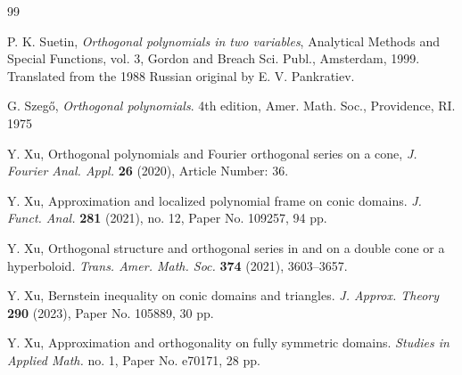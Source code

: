 \documentclass{amsart}
\theoremstyle{remark}
\def\RR{{\mathbb R}}
\begin{document}
\begin{thebibliography}{99}

        P. K. Suetin, 
        {\it Orthogonal polynomials in two variables}, Analytical Methods and Special Functions, vol. 3, 
        Gordon and Breach Sci. Publ., Amsterdam, 1999. Translated from the 1988 Russian original 
        by E. V. Pankratiev.%

       G. Szeg\H{o},
       \textit{Orthogonal polynomials}. 4th edition,
       Amer. Math. Soc., Providence, RI. 1975

       Y. Xu, 
       Orthogonal polynomials and Fourier orthogonal series on a cone, 
       {\it J. Fourier Anal. Appl.} \textbf{26} (2020), Article Number: 36.         
        
       Y. Xu, 
        Approximation and localized polynomial frame on conic domains.  
        \textit{J. Funct. Anal.} \textbf{281} (2021), no. 12, Paper No. 109257, 94 pp.

       Y. Xu, 
       Orthogonal structure and orthogonal series in and on a double cone or a hyperboloid. 
       \textit{Trans. Amer. Math. Soc.} \textbf{374} (2021), 3603--3657.
          
        Y. Xu,
        Bernstein inequality on conic domains and triangles. 
        \textit{J. Approx. Theory} \textbf{290} (2023), Paper No. 105889, 30 pp.    
   
        Y. Xu,
        Approximation and orthogonality on fully symmetric domains. \textit{Studies in Applied Math.} 
        no. 1, Paper No. e70171, 28 pp.                
\end{thebibliography}
\end{document}
